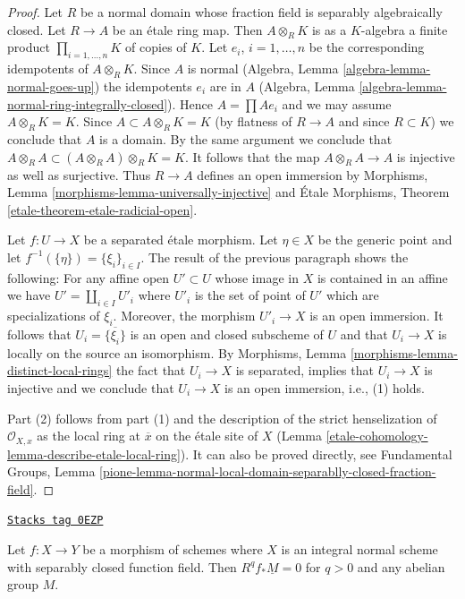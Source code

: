 \begin{proof}
Let $R$ be a normal domain whose fraction field is separably algebraically
closed. Let $R \to A$ be an \'etale ring map. Then
$A \otimes_R K$ is as a $K$-algebra a finite product
$\prod_{i = 1, \ldots, n} K$ of copies of $K$. Let $e_i$, $i = 1, \ldots, n$
be the corresponding idempotents of $A \otimes_R K$. Since $A$ is normal
(Algebra, Lemma \ref{algebra-lemma-normal-goes-up})
the idempotents $e_i$ are in $A$
(Algebra, Lemma \ref{algebra-lemma-normal-ring-integrally-closed}).
Hence $A = \prod Ae_i$ and we may assume $A \otimes_R K = K$.
Since $A \subset A \otimes_R K = K$ (by flatness of $R \to A$ and
since $R \subset K$) we conclude that $A$ is a domain.
By the same argument we conclude that
$A \otimes_R A \subset (A \otimes_R A) \otimes_R K = K$.
It follows that the map $A \otimes_R A \to A$ is
injective as well as surjective. Thus $R \to A$ defines an
open immersion by
Morphisms, Lemma \ref{morphisms-lemma-universally-injective}
and
\'Etale Morphisms, Theorem \ref{etale-theorem-etale-radicial-open}.

\medskip\noindent
Let $f : U \to X$ be a separated \'etale morphism. Let $\eta \in X$
be the generic point and let $f^{-1}(\{\eta\}) = \{\xi_i\}_{i \in I}$.
The result of the previous paragraph shows the following:
For any affine open $U' \subset U$ whose image in $X$ is contained in
an affine we have $U' = \coprod_{i \in I} U'_i$ where $U'_i$
is the set of point of $U'$ which are specializations of $\xi_i$.
Moreover, the morphism $U'_i \to X$ is an open immersion.
It follows that $U_i = \overline{\{\xi_i\}}$ is an open and closed
subscheme of $U$ and that $U_i \to X$ is locally on the source
an isomorphism. By Morphisms,
Lemma \ref{morphisms-lemma-distinct-local-rings}
the fact that $U_i \to X$ is separated, implies that
$U_i \to X$ is injective and we conclude that $U_i \to X$
is an open immersion, i.e., (1) holds.

\medskip\noindent
Part (2) follows from part (1) and the description of the strict
henselization of $\mathcal{O}_{X, x}$ as the local ring at $\overline{x}$
on the \'etale site of $X$ (Lemma \ref{etale-cohomology-lemma-describe-etale-local-ring}).
It can also be proved directly, see
Fundamental Groups, Lemma
\ref{pione-lemma-normal-local-domain-separablly-closed-fraction-field}.
\end{proof}

\begin{lemma}
\label{etale-cohomology-lemma-Rf-star-zero-normal-with-alg-closed-function-field}
\href{https://stacks.math.columbia.edu/tag/0EZP}{\texttt{Stacks tag 0EZP}}

Let $f : X \to Y$ be a morphism of schemes where $X$ is an integral
normal scheme with separably closed function field. Then
$R^qf_*\underline{M} = 0$ for $q > 0$ and any abelian group $M$.
\end{lemma}

